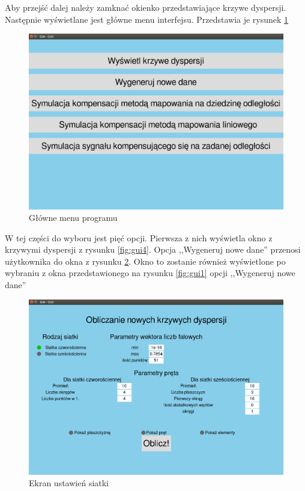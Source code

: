 Aby przejść dalej należy zamknać okienko przedstawiające krzywe dyspersji. Następnie wyświetlane jest główne menu interfejsu. Przedstawia je rysunek \ref{fig:gui6}

\begin{figure}[h]
\centering
\includegraphics[width=13cm]{Zdjecia/5/kasia/gui6}
\caption{Główne menu programu}
\label{fig:gui6}
\end{figure}

W tej części do wyboru jest pięć opcji. Pierwsza z nich wyświetla okno z krzywymi dyspersji z rysunku \ref{fig:gui4}. Opcja ,,Wygeneruj nowe dane'' przenosi użytkownika do okna z rysunku \ref{fig:gui7}. Okno to zostanie również wyświetlone po wybraniu z okna przedstawionego na rysunku \ref{fig:gui1} opcji ,,Wygeneruj nowe dane''

\begin{figure}[h]
\centering
\includegraphics[width=13cm]{Zdjecia/5/kasia/gui7}
\caption{Ekran ustawień siatki}
\label{fig:gui7}
\end{figure}

